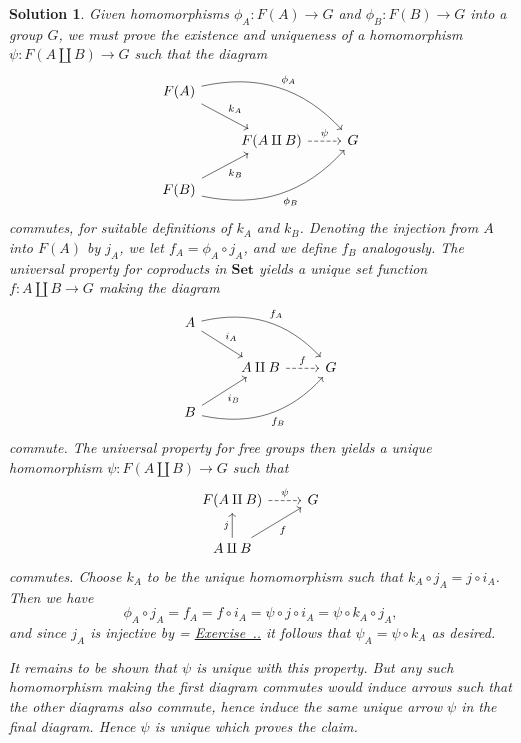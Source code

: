 \documentclass[article, a4paper, 11pt, oneside]{memoir}
\numberwithin{equation}{chapter}
\newcommand{\ncat}[1]{\mathbf{#1}} %
\newcommand{\catSet}{\ncat{Set}} %
\newcommand{\RNum}[1]{\uppercase\expandafter{\romannumeral #1\relax}}
\newcommand{\exref}[1]{%
    \setsepchar{.}%
    \readlist*\mylist{#1}%
    \ifnum \arabic{chapter}=\mylist[1]
        \def\mylabel{\mylist[2].\mylist[3]}%
    \else
        \def\mylabel{\RNum{\mylist[1]}.\mylist[2].\mylist[3]}%
    \fi
    \hyperref[ex:#1]{Exercise~\mylabel}%
}
\theoremstyle{nonumberplain}
\newtheorem{solution}{Solution}
\begin{document}
\begin{solution}
    Given homomorphisms $\phi_A \colon F(A) \to G$ and $\phi_B \colon F(B) \to G$ into a group $G$, we must prove the existence and uniqueness of a homomorphism $\psi \colon F(A \coprod B) \to G$ such that the diagram
    \begin{equation*}
        \begin{tikzcd}
            F(A)
                \ar[dr, "k_A"]
                \ar[drr, "\phi_A", bend left] \\
            & F(A \coprod B)
                \ar[r, "\psi", dashed]
            & G \\
            F(B)
                \ar[ur, "k_B", swap]
                \ar[urr, "\phi_B", bend right, swap]
        \end{tikzcd}
    \end{equation*}
    commutes, for suitable definitions of $k_A$ and $k_B$. Denoting the injection from $A$ into $F(A)$ by $j_A$, we let $f_A = \phi_A \circ j_A$, and we define $f_B$ analogously. The universal property for coproducts in $\catSet$ yields a unique set function $f \colon A \coprod B \to G$ making the diagram
    \begin{equation*}
        \begin{tikzcd}
            A
                \ar[dr, "i_A"]
                \ar[drr, "f_A", bend left] \\
            & A \coprod B
                \ar[r, "f", dashed]
            & G \\
            B
                \ar[ur, "i_B", swap]
                \ar[urr, "f_B", bend right, swap]
        \end{tikzcd}
    \end{equation*}
    commute. The universal property for free groups then yields a unique homomorphism $\psi \colon F(A \coprod B) \to G$ such that
    \begin{equation*}
        \begin{tikzcd}
            F(A \coprod B)
                \ar[r, "\psi", dashed]
            & G \\
            A \coprod B
                \ar[u, "j"]
                \ar[ur, "f", swap]
        \end{tikzcd}
    \end{equation*}
    commutes. Choose $k_A$ to be the unique homomorphism such that $k_A \circ j_A  = j \circ i_A$. Then we have
    \begin{equation*}
        \phi_A \circ j_A
            = f_A
            = f \circ i_A
            = \psi \circ j \circ i_A
            = \psi \circ k_A \circ j_A,
    \end{equation*}
    and since $j_A$ is injective by \exref{2.5.3} it follows that $\psi_A = \psi \circ k_A$ as desired.

    It remains to be shown that $\psi$ is unique with this property. But any such homomorphism making the first diagram commutes would induce arrows such that the other diagrams also commute, hence induce the same unique arrow $\psi$ in the final diagram. Hence $\psi$ is unique which proves the claim.
\end{solution}
\end{document}
